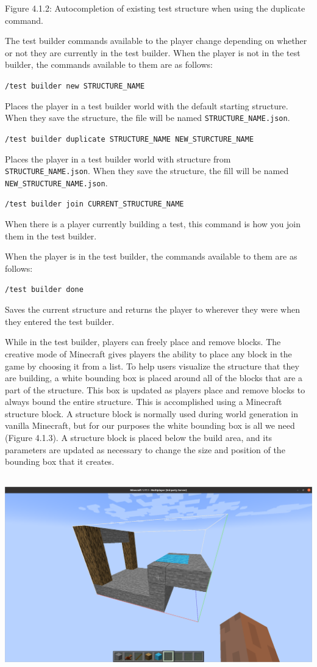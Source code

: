 \documentclass{article}
\def\code#1{\texttt{#1}}
\begin{document}
\begin{onehalfspacing}
Figure 4.1.2: Autocompletion of existing test structure when using the
duplicate command.

The test builder commands available to the player change depending on
whether or not they are currently in the test builder. When the player
is not in the test builder, the commands available to them are as
follows:

\code{/test builder new STRUCTURE\_NAME}

Places the player in a test builder world with the default starting
structure. When they save the structure, the file will be named
\code{STRUCTURE\_NAME.json}.

\code{/test builder duplicate STRUCTURE\_NAME NEW\_STURCTURE\_NAME}

Places the player in a test builder world with structure from
\code{STRUCTURE\_NAME.json}. When they save the structure, the fill will be
named \code{NEW\_STRUCTURE\_NAME.json}.

\code{/test builder join CURRENT\_STRUCTURE\_NAME}

When there is a player currently building a test, this command is how
you join them in the test builder.

When the player is in the test builder, the commands available to them
are as follows:

\code{/test builder done}

Saves the current structure and returns the player to wherever they were
when they entered the test builder.

While in the test builder, players can freely place and remove blocks.
The creative mode of Minecraft gives players the ability to place any
block in the game by choosing it from a list. To help users visualize
the structure that they are building, a white bounding box is placed
around all of the blocks that are a part of the structure. This box is
updated as players place and remove blocks to always bound the entire
structure. This is accomplished using a Minecraft structure block. A
structure block is normally used during world generation in vanilla
Minecraft, but for our purposes the white bounding box is all we need
(Figure 4.1.3). A structure block is placed below the build area, and
its parameters are updated as necessary to change the size and position
of the bounding box that it creates.

\includegraphics[width=6.07813in,height=3.34897in]{media/media/image11.png}


\end{onehalfspacing}
\end{document}
